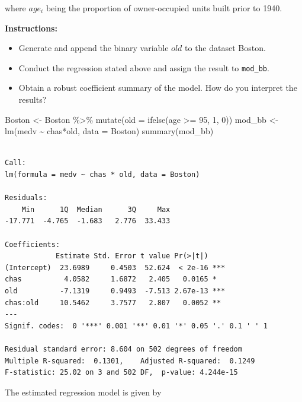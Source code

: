 \documentclass[
  12pt,
  a4paper,
]{scrbook}
\newenvironment{Shaded}{\begin{snugshade}}{\end{snugshade}}
\newcommand{\AttributeTok}[1]{\textcolor[rgb]{0.40,0.45,0.13}{#1}}
\newcommand{\DecValTok}[1]{\textcolor[rgb]{0.68,0.00,0.00}{#1}}
\newcommand{\FunctionTok}[1]{\textcolor[rgb]{0.28,0.35,0.67}{#1}}
\newcommand{\NormalTok}[1]{\textcolor[rgb]{0.00,0.23,0.31}{#1}}
\newcommand{\OtherTok}[1]{\textcolor[rgb]{0.00,0.23,0.31}{#1}}
\newcommand{\SpecialCharTok}[1]{\textcolor[rgb]{0.37,0.37,0.37}{#1}}
\providecommand{\tightlist}{%
  \setlength{\itemsep}{0pt}\setlength{\parskip}{0pt}}
\renewcommand{\tightlist}{\setlength{\itemsep}{0.5\baselineskip}\setlength{\parskip}{0.2\baselineskip}}
\theoremstyle{plain}
\theoremstyle{definition}
\theoremstyle{remark}
\begin{document}
where \(age_i\) being the proportion of owner-occupied units built prior
to 1940.

\textbf{Instructions:}

\begin{itemize}
\tightlist
\item
  Generate and append the binary variable \(old\) to the dataset Boston.
\item
  Conduct the regression stated above and assign the result to
  \texttt{mod\_bb}.
\item
  Obtain a robust coefficient summary of the model. How do you interpret
  the results?
\end{itemize}

\begin{Shaded}
\begin{Highlighting}[]
\NormalTok{Boston }\OtherTok{\textless{}{-}}\NormalTok{ Boston }\SpecialCharTok{\%\textgreater{}\%}
    \FunctionTok{mutate}\NormalTok{(}\AttributeTok{old =} \FunctionTok{ifelse}\NormalTok{(age }\SpecialCharTok{\textgreater{}=} \DecValTok{95}\NormalTok{, }\DecValTok{1}\NormalTok{, }\DecValTok{0}\NormalTok{))}
\NormalTok{mod\_bb }\OtherTok{\textless{}{-}} \FunctionTok{lm}\NormalTok{(medv }\SpecialCharTok{\textasciitilde{}}\NormalTok{ chas}\SpecialCharTok{*}\NormalTok{old, }\AttributeTok{data =}\NormalTok{ Boston)}
\FunctionTok{summary}\NormalTok{(mod\_bb)}
\end{Highlighting}
\end{Shaded}

\begin{verbatim}

Call:
lm(formula = medv ~ chas * old, data = Boston)

Residuals:
    Min      1Q  Median      3Q     Max 
-17.771  -4.765  -1.683   2.776  33.433 

Coefficients:
            Estimate Std. Error t value Pr(>|t|)    
(Intercept)  23.6989     0.4503  52.624  < 2e-16 ***
chas          4.0582     1.6872   2.405   0.0165 *  
old          -7.1319     0.9493  -7.513 2.67e-13 ***
chas:old     10.5462     3.7577   2.807   0.0052 ** 
---
Signif. codes:  0 '***' 0.001 '**' 0.01 '*' 0.05 '.' 0.1 ' ' 1

Residual standard error: 8.604 on 502 degrees of freedom
Multiple R-squared:  0.1301,    Adjusted R-squared:  0.1249 
F-statistic: 25.02 on 3 and 502 DF,  p-value: 4.244e-15
\end{verbatim}

The estimated regression model is given by
\end{document}
